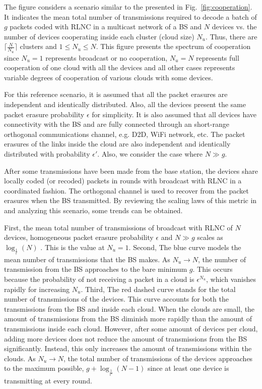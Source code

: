 The figure considers a scenario similar to the presented in Fig.~\ref{fig:cooperation}. It indicates the mean total number of transmissions required to decode a batch of $g$ packets coded with \ac{RLNC} in a multicast network of a \ac{BS} and $N$ devices vs. the number of devices cooperating inside each cluster (cloud size) $N_u$. Thus, there are $\lceil \frac{N}{N_u} \rceil$ clusters and $1 \leq N_u \leq N$. This figure presents the spectrum of cooperation since $N_u = 1$ represents broadcast or no cooperation, $N_u = N$ represents full cooperation of one cloud with all the devices and all other cases represents variable degrees of cooperation of various clouds with some devices.

For this reference scenario, it is assumed that all the packet erasures are independent and identically distributed. Also, all the devices present the same packet erasure probability $\epsilon$ for simplicity. It is also assumed that all devices have connectivity with the \ac{BS} and are fully connected through an short-range orthogonal communications channel, e.g. \ac{D2D}, \ac{WiFi} network, etc. The packet erasures of the links inside the cloud are also independent and identically distributed with probability $\epsilon'$. Also, we consider the case where $N \gg g$.

After some transmissions have been made from the base station, the devices share locally coded (or recoded) packets in rounds with broadcast with \ac{RLNC} in a coordinated fashion. The orthogonal channel is used to recover from the packet erasures when the \ac{BS} transmitted. By reviewing the scaling laws of this metric in \cite{eryilmaz2008delay} and analyzing this scenario, some trends can be obtained.

First, the mean total number of transmissions of broadcast with \ac{RLNC} of $N$ devices, homogeneous packet erasure probability $\epsilon$ and $N \gg g$ scales as $\log_{\frac{1}{\epsilon}}(N)$ \cite{eryilmaz2008delay}. This is the value at $N_u = 1$. Second, The blue curve models the mean number of transmissions that the \ac{BS} makes. As $N_u \rightarrow N$, the number of transmission from the \ac{BS} approaches to the bare minimum $g$. This occurs because the probability of not receiving a packet in a cloud is ${\epsilon}^{N_u}$, which vanishes rapidly for increasing $N_u$. Third, The red dashed curve stands for the total number of transmissions of the devices. This curve accounts for both the transmissions from the \ac{BS} and inside each cloud. When the clouds are small, the amount of transmissions from the \ac{BS} diminish more rapidly than the amount of transmissions inside each cloud. However, after some amount of devices per cloud, adding more devices does not reduce the amount of transmissions from the \ac{BS} significantly. Instead, this only increases the amount of transmissions within the clouds. As $N_u \rightarrow N$, the total number of transmissions of the devices approaches to the maximum possible, $ g + \log_{\frac{1}{\epsilon'}}(N - 1)$ since at least one device is transmitting at every round.

